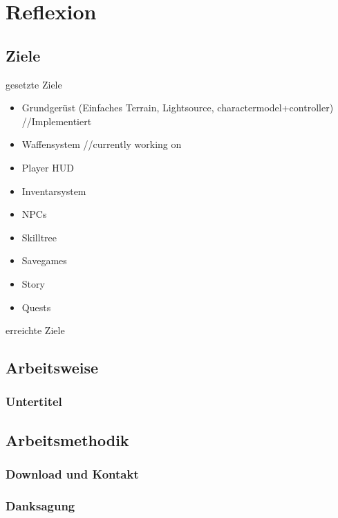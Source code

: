 \chapter{Reflexion }

\section{Ziele}

gesetzte Ziele

\begin{itemize}
\item Grundgerüst (Einfaches Terrain, Lightsource, charactermodel+controller) //Implementiert
\item Waffensystem	//currently working on
\item Player HUD
\item Inventarsystem
\item NPCs
\item Skilltree
\item Savegames
\item Story
\item Quests

\end{itemize}

erreichte Ziele

\section{Arbeitsweise}


\subsection{Untertitel}

\section{Arbeitsmethodik}

\subsection{Download und Kontakt}

\subsection{Danksagung}
